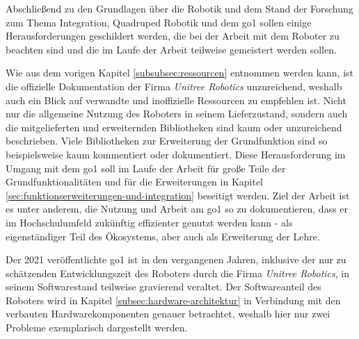 Abschließend zu den Grundlagen über die Robotik und dem Stand der Forschung zum Thema Integration, Quadruped Robotik und dem \gls{go1}
sollen einige Herausforderungen geschildert werden, die bei der Arbeit mit dem Roboter zu beachten sind und die im Laufe
der Arbeit teilweise gemeistert werden sollen.



Wie aus dem vorigen Kapitel \ref{subsubsec:ressourcen} entnommen werden kann, ist die offizielle Dokumentation der Firma
\emph{Unitree Robotics} unzureichend, weshalb auch ein Blick auf verwandte und inoffizielle Ressourcen zu empfehlen ist.
Nicht nur die allgemeine Nutzung des Roboters in seinem Lieferzustand, sondern auch die mitgelieferten und erweiternden
Bibliotheken sind kaum oder unzureichend beschrieben.
Viele Bibliotheken zur Erweiterung der Grundfunktion sind so beispielsweise kaum kommentiert oder dokumentiert.
Diese Herausforderung im Umgang mit dem \gls{go1} soll im Laufe der Arbeit für große Teile der Grundfunktionalitäten und für die Erweiterungen
in Kapitel \ref{sec:funktionserweiterungen-und-integration} beseitigt werden.
Ziel der Arbeit ist es unter anderem, die Nutzung und Arbeit am \gls{go1} so zu dokumentieren, dass er im Hochschulumfeld
zukünftig effizienter genutzt werden kann - als eigenständiger Teil des Ökosystems, aber auch als Erweiterung der Lehre.



Der \num{2021} veröffentlichte \gls{go1} ist in den vergangenen Jahren, inklusive der nur zu schätzenden Entwicklungszeit
des Roboters durch die Firma \emph{Unitree Robotics}, in seinem Softwarestand teilweise gravierend veraltet.
Der Softwareanteil des Roboters wird in Kapitel \ref{subsec:hardware-architektur} in Verbindung mit den verbauten
Hardwarekomponenten genauer betrachtet, weshalb hier nur zwei Probleme exemplarisch dargestellt werden.

